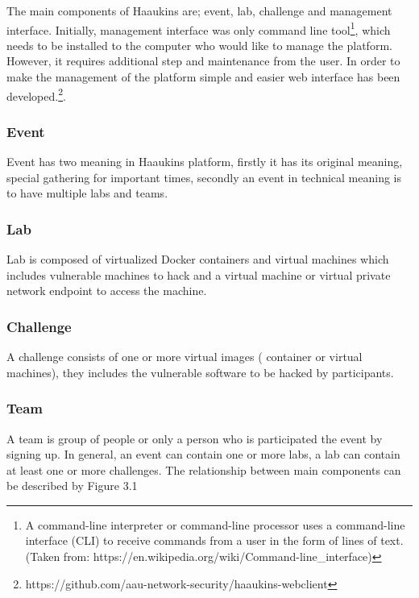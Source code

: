  The main components of Haaukins are; event, lab, challenge and management interface. Initially, management interface was only command line tool\footnote{A command-line interpreter or command-line processor uses a command-line interface (CLI) to receive commands from a user in the form of lines of text. (Taken from: https://en.wikipedia.org/wiki/Command-line_interface)}, which needs to be installed to the computer who would like to manage the platform. However, it requires additional step and maintenance from the user. In order to make the management of the platform simple and easier web interface has been developed.\footnote{https://github.com/aau-network-security/haaukins-webclient}. 
 \subsubsection{Event}
 Event has two meaning in Haaukins platform, firstly it has its original meaning, special gathering for important times, secondly an event  in technical meaning is to have multiple labs and teams. 
 
 \subsubsection{Lab}
 Lab is composed of virtualized Docker containers and virtual machines which includes vulnerable machines to hack and a virtual machine or virtual private network endpoint to access the machine. 
 
 \subsubsection{Challenge}
 A challenge consists of one or more virtual images ( container or virtual machines), they includes the vulnerable software to be hacked by participants. 
 
 \subsubsection{Team}
 A team is group of people or only a person who is participated the event by signing up. \newline
 \newline
 In general, an event can contain one or more labs, a lab can contain at least one or more challenges. The relationship between main components can be described by Figure 3.1
 
 
 
 
 
 